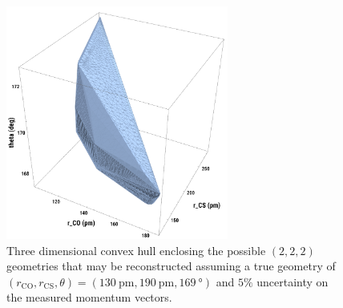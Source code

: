 
\begin{figure}
  \centering
  \includegraphics[width=0.65\textwidth]{Gfx/3DConvexHull}
  \caption[Three dimensional convex hull enclosing a set of reconstructed geometries for heuristic uncertainty quantification.]
  {Three dimensional convex hull enclosing the possible  $(2,2,2)$ geometries that may be reconstructed assuming a true geometry of $(r_\mathrm{CO}, r_\mathrm{CS}, \theta) = (\SI{130}{\pico\m}, \SI{190}{\pico\m}, \SI{169}{\degree})$ and $5\%$ uncertainty on the measured momentum vectors.}
  \label{fig:3DConvexHull}
\end{figure}

